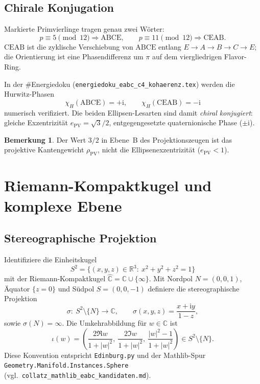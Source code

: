 \documentclass[11pt,a4paper]{article}
\theoremstyle{definition}
\newtheorem{bemerkung}[definition]{Bemerkung}
\theoremstyle{remark}
\newcommand{\R}{\mathbb{R}}
\newcommand{\C}{\mathbb{C}}
\newcommand{\Chat}{\widehat{\C}}
\begin{document}
\subsection{Chirale Konjugation}

Markierte Primvierlinge tragen genau zwei Wörter:
\[
p\equiv 5\pmod{12}\Rightarrow \mathrm{ABCE},\qquad
p\equiv 11\pmod{12}\Rightarrow \mathrm{CEAB}.
\]
$\mathrm{CEAB}$ ist die zyklische Verschiebung von $\mathrm{ABCE}$
entlang $E\to A\to B\to C\to E$; die Orientierung ist eine
Phasendifferenz um $\pi$ auf dem viergliedrigen Flavor-Ring.

In der \#Energiedoku (\texttt{energiedoku\_eabc\_c4\_kohaerenz.tex})
werden die Hurwitz-Phasen
\[
\chi_H(\mathrm{ABCE})=+\mathrm{i},\qquad
\chi_H(\mathrm{CEAB})=-\mathrm{i}
\]
numerisch verifiziert. Die beiden Ellipsen-Lesarten sind damit
\emph{chiral konjugiert}: gleiche Exzentrizität $e_{\mathrm{PV}}=\sqrt{3}/2$,
entgegengesetzte quaternionische Phase ($\pm\mathrm{i}$).

\begin{bemerkung}
Der Wert $3/2$ in Ebene~B des Projektionszeugen ist das
projektive Kantengewicht $\rho_{\mathrm{PV}}$, nicht die
Ellipsenexzentrizität ($e_{\mathrm{PV}}<1$).
\end{bemerkung}

\section{Riemann-Kompaktkugel und komplexe Ebene}

\subsection{Stereographische Projektion}

Identifiziere die Einheitskugel
\[
S^2=\{(x,y,z)\in\R^3:\ x^2+y^2+z^2=1\}
\]
mit der Riemann-Kompaktkugel $\Chat=\C\cup\{\infty\}$.
Mit Nordpol $N=(0,0,1)$, Äquator $\{z=0\}$ und Südpol $S=(0,0,-1)$
definiere die stereographische Projektion
\[
\sigma:\ S^2\setminus\{N\}\longrightarrow \C,\qquad
\sigma(x,y,z)=\frac{x+\mathrm{i}y}{1-z},
\]
sowie $\sigma(N)=\infty$. Die Umkehrabbildung für $w\in\C$ ist
\[
\iota(w)=\left(
  \frac{2\Re w}{1+|w|^2},\
  \frac{2\Im w}{1+|w|^2},\
  \frac{|w|^2-1}{1+|w|^2}
\right)\in S^2\setminus\{N\}.
\]
Diese Konvention entspricht \texttt{Edinburg.py} und der
Mathlib-Spur \texttt{Geometry.Manifold.Instances.Sphere}
(vgl.\ \texttt{collatz\_mathlib\_eabc\_kandidaten.md}).
\end{document}

